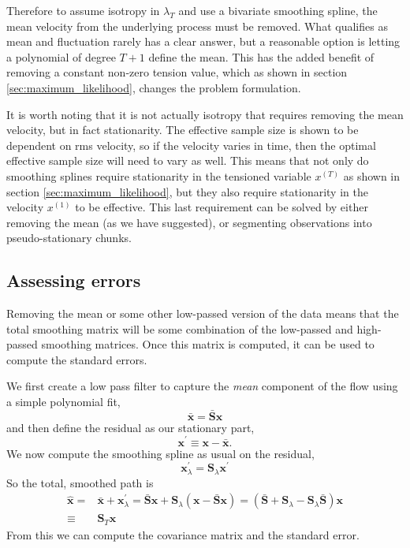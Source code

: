 \documentclass{ametsoc}
\begin{document}
Therefore to assume isotropy in $\lambda_T$ and use a bivariate smoothing spline, the mean velocity from the underlying process must be removed. What qualifies as mean and fluctuation rarely has a clear answer, but a reasonable option is letting a polynomial of degree $T+1$ define the mean. This has the added benefit of removing a constant non-zero tension value, which as shown in section \ref{sec:maximum_likelihood}, changes the problem formulation. 

It is worth noting that it is not actually isotropy that requires removing the mean velocity, but in fact stationarity. The effective sample size is shown to be dependent on rms velocity, so if the velocity varies in time, then the optimal effective sample size will need to vary as well. This means that not only do smoothing splines require stationarity in the tensioned variable $x^{(T)}$ as shown in section \ref{sec:maximum_likelihood}, but they also require stationarity in the velocity $x^{(1)}$ to be effective. This last requirement can be solved by either removing the mean (as we have suggested), or segmenting observations into pseudo-stationary chunks.

\subsection{Assessing errors}
\label{sec:errors_wit_mean}

Removing the mean or some other low-passed version of the data means that the total smoothing matrix will be some combination of the low-passed and high-passed smoothing matrices. Once this matrix is computed, it can be used to compute the standard errors.

We first create a low pass filter to capture the \emph{mean} component of the flow using a simple polynomial fit,
\begin{equation}
\bar{\mathbf{x}} = \bar{\mathbf{S}} \mathbf{x}
\end{equation}
and then define the residual as our stationary part,
\begin{equation}
\mathbf{x}^\prime \equiv \mathbf{x} - \bar{\mathbf{x}}.
\end{equation}
We now compute the smoothing spline as usual on the residual,
\begin{equation}
\mathbf{x}^\prime_\lambda = \mathbf{S}_\lambda \mathbf{x}^\prime
\end{equation}
So the total, smoothed path is
\begin{align}
\hat{\mathbf{x}} =& \bar{\mathbf{x}} + \mathbf{x}^\prime_\lambda = \bar{\mathbf{S}} \mathbf{x} + \mathbf{S}_\lambda \left( \mathbf{x} - \bar{\mathbf{S}} \mathbf{x} \right) = \left(\bar{\mathbf{S}} + \mathbf{S}_\lambda - \mathbf{S}_\lambda \bar{\mathbf{S}}\right)\mathbf{x} \nonumber \\
\equiv& \mathbf{S}_T \mathbf{x}
\end{align}
From this we can compute the covariance matrix and the standard error.
\end{document}
